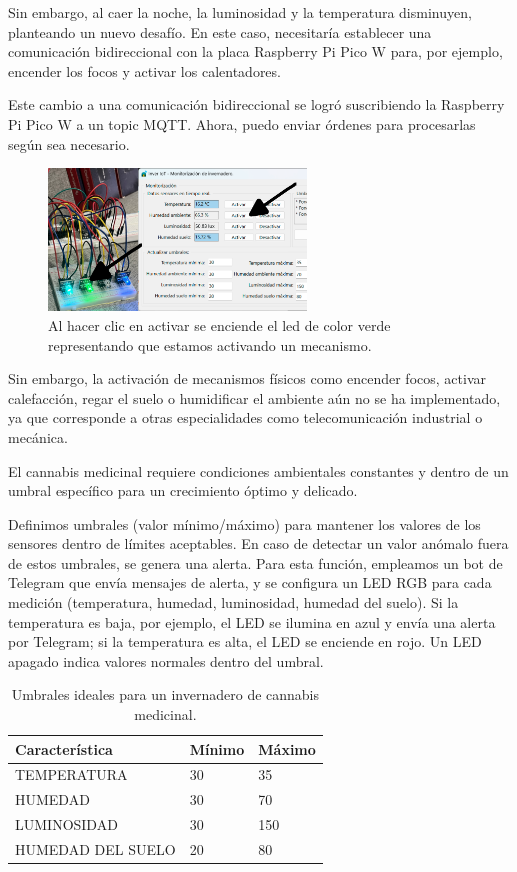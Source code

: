 Sin embargo, al caer la noche, la luminosidad y la temperatura disminuyen, planteando un nuevo desafío. En este caso, necesitaría establecer una comunicación bidireccional con la placa Raspberry Pi Pico W para, por ejemplo, encender los focos y activar los calentadores.

Este cambio a una comunicación bidireccional se logró suscribiendo la Raspberry Pi Pico W a un topic MQTT. Ahora, puedo enviar órdenes para procesarlas según sea necesario. 

\begin{figure}[h]
	\centering
	\includegraphics[width=0.61\textwidth]{img/desarrollo/InverIoT_verde_clickMecanismo.png}
	\caption{Al hacer clic en activar se enciende el led de color verde representando que estamos activando un mecanismo.}
\end{figure}

Sin embargo, la activación de mecanismos físicos como encender focos, activar calefacción, regar el suelo o humidificar el ambiente aún no se ha implementado, ya que corresponde a otras especialidades como telecomunicación industrial o mecánica.

El cannabis medicinal requiere condiciones ambientales constantes y dentro de un umbral específico para un crecimiento óptimo y delicado.

Definimos umbrales (valor mínimo/máximo) para mantener los valores de los sensores dentro de límites aceptables. En caso de detectar un valor anómalo fuera de estos umbrales, se genera una alerta. Para esta función, empleamos un bot de Telegram que envía mensajes de alerta, y se configura un LED RGB para cada medición (temperatura, humedad, luminosidad, humedad del suelo). Si la temperatura es baja, por ejemplo, el LED se ilumina en azul y envía una alerta por Telegram; si la temperatura es alta, el LED se enciende en rojo. Un LED apagado indica valores normales dentro del umbral.

\begin{table}[htbp]
\begin{center}
\caption{Umbrales ideales para un invernadero de cannabis medicinal.}
\begin{tabular}{|l|l|l|}
\hline
\rowcolor[HTML]{C0C0C0} 
\textbf{Característica} & \textbf{Mínimo} & \textbf{Máximo} \\ \hline
TEMPERATURA & 30 & 35\\ \hline
HUMEDAD & 30 & 70\\ \hline
LUMINOSIDAD & 30 & 150\\ \hline
HUMEDAD DEL SUELO & 20 & 80\\ \hline
\end{tabular}
\end{center}
\end{table}

